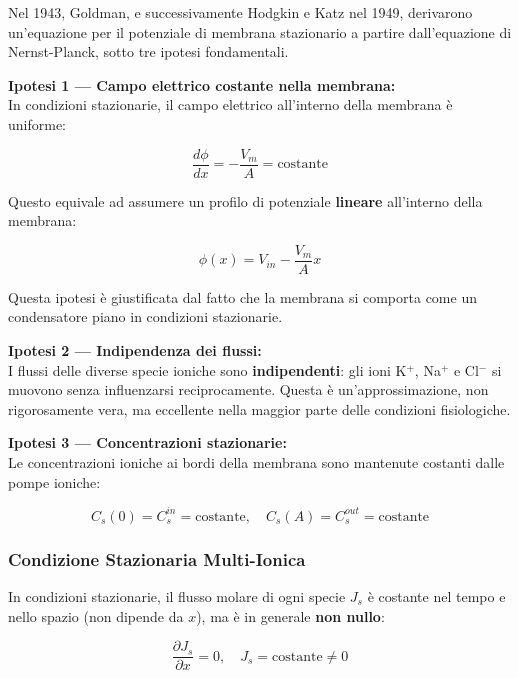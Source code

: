 Nel 1943, Goldman, e successivamente Hodgkin e Katz nel 1949, derivarono un'equazione per il potenziale di membrana stazionario a partire dall'equazione di Nernst-Planck, sotto tre ipotesi fondamentali.



\textbf{Ipotesi 1 — Campo elettrico costante nella membrana:}\\
In condizioni stazionarie, il campo elettrico all'interno della membrana è uniforme:

\begin{equation}
\frac{d\phi}{dx} = -\frac{V_m}{A} = \text{costante}
\end{equation}

Questo equivale ad assumere un profilo di potenziale \textbf{lineare} all'interno della membrana:

\begin{equation}
\phi(x) = V_{in} - \frac{V_m}{A} x
\end{equation}

Questa ipotesi è giustificata dal fatto che la membrana si comporta come un condensatore piano in condizioni stazionarie.

\textbf{Ipotesi 2 — Indipendenza dei flussi:}\\
I flussi delle diverse specie ioniche sono \textbf{indipendenti}: gli ioni K$^+$, Na$^+$ e Cl$^-$ si muovono senza influenzarsi reciprocamente. Questa è un'approssimazione, non rigorosamente vera, ma eccellente nella maggior parte delle condizioni fisiologiche.

\textbf{Ipotesi 3 — Concentrazioni stazionarie:}\\
Le concentrazioni ioniche ai bordi della membrana sono mantenute costanti dalle pompe ioniche:

\begin{equation}
C_s(0) = C_s^{in} = \text{costante}, \quad C_s(A) = C_s^{out} = \text{costante}
\end{equation}

\subsubsection{Condizione Stazionaria Multi-Ionica}

In condizioni stazionarie, il flusso molare di ogni specie $J_s$ è costante nel tempo e nello spazio (non dipende da $x$), ma è in generale \textbf{non nullo}:

\begin{equation}
\frac{\partial J_s}{\partial x} = 0, \quad J_s = \text{costante} \neq 0
\end{equation}


